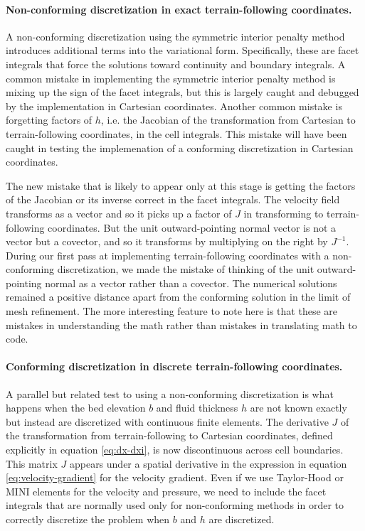 \documentclass[gmd, manuscript]{copernicus}
\begin{document}
\paragraph{Non-conforming discretization in exact terrain-following coordinates.}
A non-conforming discretization using the symmetric interior penalty method introduces additional terms into the variational form.
Specifically, these are facet integrals that force the solutions toward continuity and boundary integrals.
A common mistake in implementing the symmetric interior penalty method is mixing up the sign of the facet integrals, but this is largely caught and debugged by the implementation in Cartesian coordinates.
Another common mistake is forgetting factors of $h$, i.e. the Jacobian of the transformation from Cartesian to terrain-following coordinates, in the cell integrals.
This mistake will have been caught in testing the implemenation of a conforming discretization in Cartesian coordinates.

The new mistake that is likely to appear only at this stage is getting the factors of the Jacobian or its inverse correct in the facet integrals.
The velocity field transforms as a vector and so it picks up a factor of $J$ in transforming to terrain-following coordinates.
But the unit outward-pointing normal vector is not a vector but a covector, and so it transforms by multiplying on the right by $J^{-1}$.
During our first pass at implementing terrain-following coordinates with a non-conforming discretization, we made the mistake of thinking of the unit outward-pointing normal as a vector rather than a covector.
The numerical solutions remained a positive distance apart from the conforming solution in the limit of mesh refinement.
The more interesting feature to note here is that these are mistakes in understanding the math rather than mistakes in translating math to code.

\paragraph{Conforming discretization in discrete terrain-following coordinates.}
A parallel but related test to using a non-conforming discretization is what happens when the bed elevation $b$ and fluid thickness $h$ are not known exactly but instead are discretized with continuous finite elements.
The derivative $J$ of the transformation from terrain-following to Cartesian coordinates, defined explicitly in equation \eqref{eq:dx-dxi}, is now discontinuous across cell boundaries.
This matrix $J$ appears under a spatial derivative in the expression in equation \eqref{eq:velocity-gradient} for the velocity gradient.
Even if we use Taylor-Hood or MINI elements for the velocity and pressure, we need to include the facet integrals that are normally used only for non-conforming methods in order to correctly discretize the problem when $b$ and $h$ are discretized.
\end{document}
